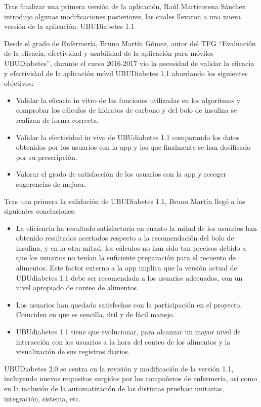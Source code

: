 Tras finalizar una primera versión de la aplicación, Raúl Marticorena Sánchez introdujo algunas modificaciones posteriores, las cuales llevaron a una nueva versión de la aplicación: UBUDiabetes 1.1

Desde el grado de Enfermería, Bruno Martín Gómez, autor del TFG ``Evaluación de la eficacia, efectividad y usabilidad de la aplicación para móviles UBUDiabetes'', durante el curso 2016-2017 vio la necesidad de validar la eficacia y efectividad de la aplicación móvil UBUDiabetes 1.1 abordando los siguientes objetivos\cite{bruno2017}:
\begin{itemize}
	\item Validar la eficacia in vitro de las funciones utilizadas en los algoritmos y comprobar los cálculos de hidratos de carbono y del bolo de insulina se realizan de forma correcta.
	\item Validar la efectividad in vivo de UBUdiabetes 1.1 comparando los datos obtenidos por los usuarios con la app y los que finalmente se han dosificado por su prescripción.
	\item Valorar el grado de satisfacción de los usuarios con la app y recoger sugerencias de mejora.
\end{itemize}
Tras una primera la validación de UBUDiabetes 1.1, Bruno Martín llegó a las siguientes conclusiones\cite{bruno2017}:
\begin{itemize}
	\item La eficiencia ha resultado satisfactoria en cuanto la mitad de los usuarios han obtenido resultados acertados respecto a la recomendación del bolo de insulina, y en la otra mitad, los cálculos no han sido tan precisos debido a que los usuarios no tenían la suficiente preparación para el recuento de alimentos. Este factor externo a la app implica que la versión actual de UBUdiabetes 1.1 debe ser recomendada a los usuarios adecuados, con un nivel apropiado de conteo de alimentos.
	\item Los usuarios han quedado satisfechos con la participación en el proyecto. Coinciden en que es sencilla, útil y de fácil manejo.
	\item UBUdiabetes 1.1 tiene que evolucionar, para alcanzar un mayor nivel de interacción con los usuarios a la hora del conteo de los alimentos y la visualización de sus registros diarios.
\end{itemize}

UBUDiabetes 2.0 se centra en la revisión y modificación de la versión 1.1, incluyendo nuevos requisitos surgidos por los compañeros de enfermería, así como en la inclusión de la automatización de las distintas pruebas: unitarias, integración, sistema, etc. 